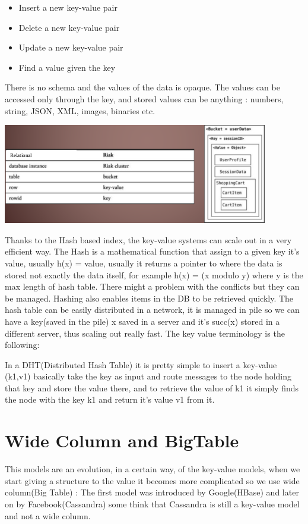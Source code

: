 \documentclass[a4page, 11pt]{article}
\begin{document}
\begin{itemize}[noitemsep]
	\item
	Insert a new key-value pair
	\item
	Delete a new key-value pair
	\item
	Update a new key-value pair
	\item
	Find a value given the key
\end{itemize}

There is no schema and the values of the data is opaque. The values can
be accessed only through the key, and stored values can be anything :
numbers, string, JSON, XML, images, binaries etc.
\begin{center}
	\includegraphics[scale=0.6]{IMAGE4.jpg}
\end{center}
Thanks to the Hash based index, the key-value systems can scale out in a very
efficient way. The Hash is a mathematical function that assign to a
given key it's value, usually h(x) = value, usually it returns a pointer
to where the data is stored not exactly the data itself, for example
h(x) = (x modulo y) where y is the max length of hash table. There might
a problem with the conflicts but they can be managed. Hashing also
enables items in the DB to be retrieved quickly. The hash table can be
easily distributed in a network, it is managed in pile so we can have a
key(saved in the pile) x saved in a server and it's succ(x) stored in a
different server, thus scaling out really fast. The key value
terminology is the following:

In a DHT(Distributed Hash Table) it is pretty simple to insert a
key-value (k1,v1) basically take the key as input and route messages to
the node holding that key and store the value there, and to retrieve the
value of k1 it simply finds the node with the key k1 and return it's
value v1 from it.

\section{Wide Column and BigTable}
This models are an evolution, in a certain way, of the key-value models,
when we start giving a structure to the value it becomes more
complicated so we use wide column(Big Table) : The first model was
introduced by Google(HBase) and later on by Facebook(Cassandra) some
think that Cassandra is still a key-value model and not a wide column.
\end{document}
